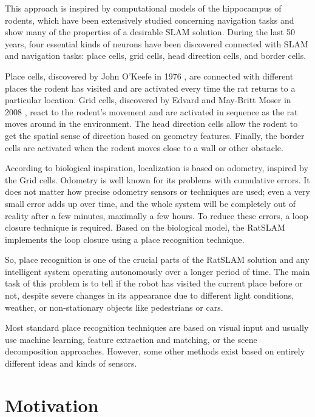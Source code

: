This approach is inspired by computational models of the hippocampus of rodents, which have been extensively studied concerning navigation tasks and show many of the properties of a desirable SLAM solution. During the last 50 years, four essential kinds of neurons have been discovered connected with SLAM and navigation tasks: place cells, grid cells, head direction cells, and border cells.\par
Place cells, discovered by John O'Keefe in 1976 \cite{placeCells}, are connected with different places the rodent has visited and are activated every time the rat returns to a particular location. Grid cells, discovered by Edvard and May-Britt Moser in 2008 \cite{gridCells}, react to the rodent's movement and are activated in sequence as the rat moves around in the environment. The head direction cells allow the rodent to get the spatial sense of direction based on geometry features. Finally, the border cells are activated when the rodent moves close to a wall or other obstacle.\par
According to biological inspiration, localization is based on odometry, inspired by the Grid cells. Odometry is well known for its problems with cumulative errors. It does not matter how precise odometry sensors or techniques are used; even a very small error adds up over time, and the whole system will be completely out of reality after a few minutes, maximally a few hours. To reduce these errors, a loop closure technique is required. Based on the biological model, the RatSLAM implements the loop closure using a place recognition technique.\par
So, place recognition is one of the crucial parts of the RatSLAM solution and any intelligent system operating autonomously over a longer period of time. The main task of this problem is to tell if the robot has visited the current place before or not, despite severe changes in its appearance due to different light conditions, weather, or non-stationary objects like pedestrians or cars.\par
Most standard place recognition techniques are based on visual input and usually use machine learning, feature extraction and matching, or the scene decomposition approaches. However, some other methods exist based on entirely different ideas and kinds of sensors.


\section{Motivation}\label{section:motivation}

